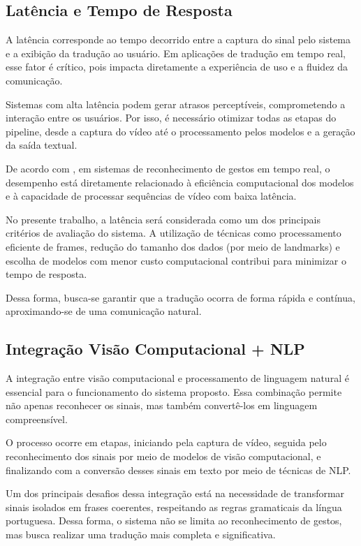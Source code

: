 \documentclass[
    12pt,                %
    openright,           %
    oneside,             %
    a4paper,             %
    english,             %
    brazil               %
]{abntex2}
\begin{document}
\subsection{Latência e Tempo de Resposta}

A latência corresponde ao tempo decorrido entre a captura do sinal pelo sistema e a exibição da tradução ao usuário. Em aplicações de tradução em tempo real, esse fator é crítico, pois impacta diretamente a experiência de uso e a fluidez da comunicação.

Sistemas com alta latência podem gerar atrasos perceptíveis, comprometendo a interação entre os usuários. Por isso, é necessário otimizar todas as etapas do pipeline, desde a captura do vídeo até o processamento pelos modelos e a geração da saída textual.

De acordo com , em sistemas de reconhecimento de gestos em tempo real, o desempenho está diretamente relacionado à eficiência computacional dos modelos e à capacidade de processar sequências de vídeo com baixa latência.

No presente trabalho, a latência será considerada como um dos principais critérios de avaliação do sistema. A utilização de técnicas como processamento eficiente de frames, redução do tamanho dos dados (por meio de landmarks) e escolha de modelos com menor custo computacional contribui para minimizar o tempo de resposta.

Dessa forma, busca-se garantir que a tradução ocorra de forma rápida e contínua, aproximando-se de uma comunicação natural.

\subsection{Integração Visão Computacional + NLP}

A integração entre visão computacional e processamento de linguagem natural é essencial para o funcionamento do sistema proposto. Essa combinação permite não apenas reconhecer os sinais, mas também convertê-los em linguagem compreensível.

O processo ocorre em etapas, iniciando pela captura de vídeo, seguida pelo reconhecimento dos sinais por meio de modelos de visão computacional, e finalizando com a conversão desses sinais em texto por meio de técnicas de NLP.

Um dos principais desafios dessa integração está na necessidade de transformar sinais isolados em frases coerentes, respeitando as regras gramaticais da língua portuguesa. Dessa forma, o sistema não se limita ao reconhecimento de gestos, mas busca realizar uma tradução mais completa e significativa.
\end{document}
